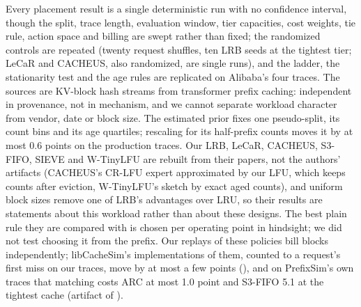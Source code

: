 Every placement result is a single deterministic run with no confidence interval, though the split,
trace length, evaluation window, tier capacities, cost weights, tie rule, action space and billing are swept
rather than fixed; the randomized controls are repeated (twenty request shuffles, ten LRB seeds at the
tightest tier; LeCaR and CACHEUS, also randomized, are single runs), and the ladder, the stationarity test and the age rules are replicated on Alibaba's four traces. The sources
are KV-block hash streams from transformer prefix caching: independent in provenance, not in mechanism,
and we cannot separate workload character from vendor, date or block size. The estimated prior fixes one
pseudo-split, its count bins and its age quartiles; rescaling for its half-prefix counts moves it by at most
0.6 points on the production traces. Our LRB, LeCaR, CACHEUS, S3-FIFO, SIEVE and W-TinyLFU are rebuilt from
their papers, not the authors' artifacts (CACHEUS's CR-LFU expert approximated by our LFU, which keeps counts after eviction, W-TinyLFU's sketch by
exact aged counts), and uniform block sizes remove one of LRB's advantages over LRU, so their results are
statements about this workload rather than about these designs. The best plain rule they are compared
with is chosen per operating point in hindsight; we did not test choosing it from the prefix. Our replays of
these policies bill blocks independently; libCacheSim's implementations of them, counted to a request's first
miss on our traces, move by at most a few points (), and on PrefixSim's own traces that
matching costs ARC at most 1.0 point and S3-FIFO 5.1 at the tightest cache (artifact of ).

